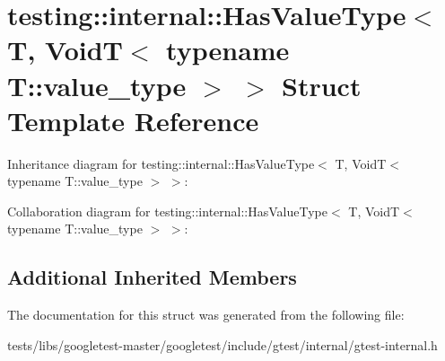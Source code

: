 \hypertarget{structtesting_1_1internal_1_1HasValueType_3_01T_00_01VoidT_3_01typename_01T_1_1value__type_01_4_01_4}{}\section{testing\+:\+:internal\+:\+:Has\+Value\+Type$<$ T, VoidT$<$ typename T\+:\+:value\+\_\+type $>$ $>$ Struct Template Reference}
\label{structtesting_1_1internal_1_1HasValueType_3_01T_00_01VoidT_3_01typename_01T_1_1value__type_01_4_01_4}


Inheritance diagram for testing\+:\+:internal\+:\+:Has\+Value\+Type$<$ T, VoidT$<$ typename T\+:\+:value\+\_\+type $>$ $>$\+:


Collaboration diagram for testing\+:\+:internal\+:\+:Has\+Value\+Type$<$ T, VoidT$<$ typename T\+:\+:value\+\_\+type $>$ $>$\+:
\subsection*{Additional Inherited Members}


The documentation for this struct was generated from the following file\+:\begin{DoxyCompactItemize}
\item 
tests/libs/googletest-\/master/googletest/include/gtest/internal/gtest-\/internal.\+h\end{DoxyCompactItemize}
